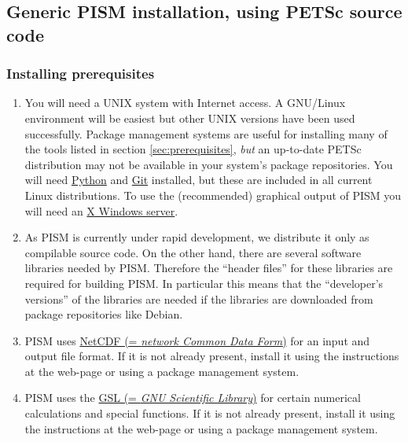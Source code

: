 \documentclass[titlepage,letterpaper,final]{scrartcl}
\begin{document}
\subsection{Generic PISM installation, using PETSc source code}\label{subsec:generic}

\subsubsection{Installing prerequisites}
\renewcommand{\labelenumi}{\textbf{\arabic{enumi}.}~}
\begin{enumerate}
\item You will need a UNIX system with Internet access. A GNU/Linux environment
  will be easiest but other UNIX versions have been used successfully. Package
  management systems are useful for installing many of the tools listed in
  section \ref{sec:prerequisites}, \emph{but} an up-to-date PETSc distribution
  may not be available in your system's package repositories. You will need
  \href{http://www.python.org/}{Python} and \href{http://git-scm.com/}{Git}
  installed, but these are included in all current Linux distributions. To use
  the (recommended) graphical output of PISM you will need an
  \href{http://www.x.org/}{X Windows server}.

\item As PISM is currently under rapid development, we distribute it only as
  compilable source code. On the other hand, there are several software
  libraries needed by PISM. Therefore the ``header files'' for these libraries
  are required for building PISM. In particular this means that the
  ``developer's versions'' of the libraries are needed if the libraries are
  downloaded from package repositories like Debian.

\item PISM uses \href{http://www.unidata.ucar.edu/software/netcdf/}{NetCDF (=
    \emph{network Common Data Form})} for an input and output
  file format. If it is not already present, install it using the instructions
  at the web-page or using a package management system.

\item PISM uses the \href{http://www.gnu.org/software/gsl/}{GSL (= \emph{GNU
      Scientific Library})} for
  certain numerical calculations and special functions. If it is not already
  present, install it using the instructions at the web-page or using a package
  management system.


\end{enumerate}
\end{document}

